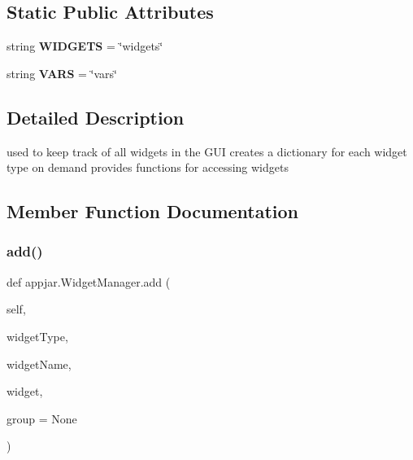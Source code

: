 \subsection*{Static Public Attributes}
\begin{DoxyCompactItemize}
\item 
\mbox{\label{classappjar_1_1_widget_manager_af1aa3cbbf581b0cf3dbb8245b62d943b}} 
string {\bfseries W\+I\+D\+G\+E\+TS} = \char`\"{}widgets\char`\"{}
\item 
\mbox{\label{classappjar_1_1_widget_manager_a2ea18dbcad0db54bf6f09124b9006662}} 
string {\bfseries V\+A\+RS} = \char`\"{}vars\char`\"{}
\end{DoxyCompactItemize}


\subsection{Detailed Description}
\begin{DoxyVerb}used to keep track of all widgets in the GUI
    creates a dictionary for each widget type on demand
    provides functions for accessing widgets \end{DoxyVerb}
 

\subsection{Member Function Documentation}
\mbox{\label{classappjar_1_1_widget_manager_a237b5408dafc346803d9df8053332fad}} 
\subsubsection{\texorpdfstring{add()}{add()}}
{\footnotesize\ttfamily def appjar.\+Widget\+Manager.\+add (\begin{DoxyParamCaption}\item[{}]{self,  }\item[{}]{widget\+Type,  }\item[{}]{widget\+Name,  }\item[{}]{widget,  }\item[{}]{group = {\ttfamily None} }\end{DoxyParamCaption})}

